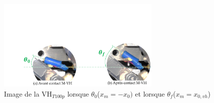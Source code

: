 \documentclass[3p,twocolumn,preprint]{elsarticle}
\begin{document}
\begin{figure}[!htbp]
\begin{center}
	\captionsetup{justification=centering}
	\includegraphics[trim={4cm 0cm 0cm 9.5cm},clip,width=0.7\textwidth]{figures/contact_M_VH_lachers.pdf}
	\caption{Image de la VH$_{T100p}$ lorsque $\theta_0$($x_m=-x_{0})$ et lorsque $\theta_f$($x_m=x_{0,vh}$)}
	\label{fig:contact_M_VH_lachers}
\end{center}
\end{figure}
\end{document}

